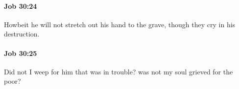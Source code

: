 		\paragraph{Job 30:24} %
			\label{JOB-30-24}

			Howbeit he will not stretch out his hand to the grave, though they cry in his destruction.


		\paragraph{Job 30:25} %
			\label{JOB-30-25}

			Did not I weep for him that was in trouble? was not my soul grieved for the poor?


